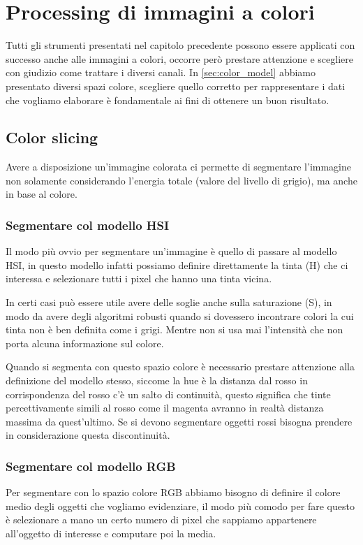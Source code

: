 \chapter{Processing di immagini a colori}
Tutti gli strumenti presentati nel capitolo precedente possono essere applicati con successo anche alle immagini a colori, occorre però prestare attenzione e scegliere con giudizio come trattare i diversi canali. In \ref{sec:color_model} abbiamo presentato diversi spazi colore, scegliere quello corretto per rappresentare i dati che vogliamo elaborare è fondamentale ai fini di ottenere un buon risultato.

\section{Color slicing}
Avere a disposizione un'immagine colorata ci permette di segmentare l'immagine non solamente considerando l'energia totale (valore del livello di grigio), ma anche in base al colore.

\subsection{Segmentare col modello HSI}
Il modo più ovvio per segmentare un'immagine è quello di passare al modello HSI, in questo modello infatti possiamo definire direttamente la tinta (H) che ci interessa e selezionare tutti i pixel che hanno una tinta vicina.

In certi casi può essere utile avere delle soglie anche sulla saturazione (S), in modo da avere degli algoritmi robusti quando si dovessero incontrare colori la cui tinta non è ben definita come i grigi. Mentre non si usa mai l'intensità che non porta alcuna informazione sul colore.

Quando si segmenta con questo spazio colore è necessario prestare attenzione alla definizione del modello stesso, siccome la hue è la distanza dal rosso in corrispondenza del rosso c'è un salto di continuità, questo significa che tinte percettivamente simili al rosso come il magenta avranno in realtà distanza massima da quest'ultimo. Se si devono segmentare oggetti rossi bisogna prendere in considerazione questa discontinuità.

\subsection{Segmentare col modello RGB}
Per segmentare con lo spazio colore RGB abbiamo bisogno di definire il colore medio degli oggetti che vogliamo evidenziare, il modo più comodo per fare questo è selezionare a mano un certo numero di pixel che sappiamo appartenere all'oggetto di interesse e computare poi la media.

